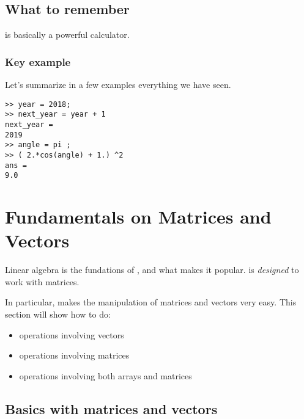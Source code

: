 \section{What to remember}

\matlab is basically a powerful calculator.

\subsection{Key example}
Let's summarize in a few examples everything we have seen.

\begin{lstlisting}
>> year = 2018;
>> next_year = year + 1
next_year = 
2019
>> angle = pi ;
>> ( 2.*cos(angle) + 1.) ^2 
ans = 
9.0
\end{lstlisting}











\chapter{Fundamentals on Matrices and Vectors}

Linear algebra is the fundations of \matlab, and what makes it popular.
\matlab is \emph{designed} to work with matrices.

In particular, \matlab makes the manipulation of matrices and vectors very easy.
This section will show how to do:
\begin{itemize}
	\item operations involving vectors
	\item operations involving matrices
	\item operations involving both arrays and matrices
\end{itemize}



\section{Basics with matrices and vectors}



